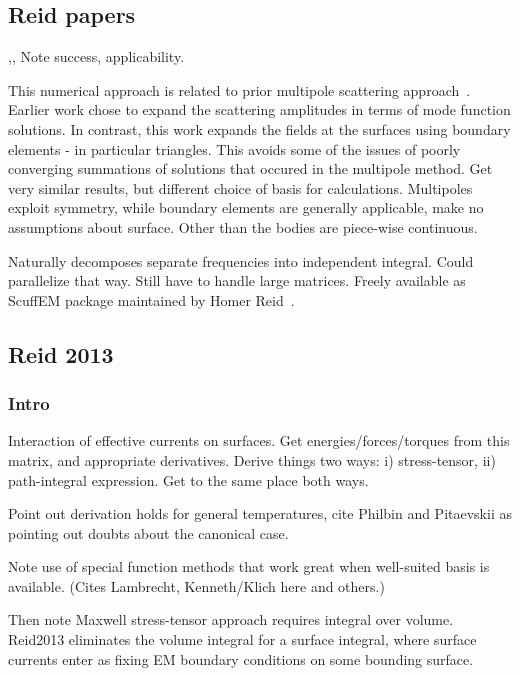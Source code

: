 \subsection{Reid papers}

\cite{Reid2009},\cite{Reid2011}, \cite{Reid2013} 
Note success, applicability.  

This numerical approach is related to prior multipole scattering approach~\cite{Rahi2009}.
Earlier work chose to expand the scattering amplitudes in terms of mode function
solutions.  In contrast, this work expands the fields at the surfaces using 
boundary elements - in particular triangles.  
This avoids some of the issues of poorly converging summations of solutions that occured in
the multipole method.  Get very similar results, but different choice of basis for calculations.
Multipoles exploit symmetry, while boundary elements are generally applicable, make no assumptions 
about surface.  Other than the bodies are piece-wise continuous.  

Naturally decomposes separate frequencies into independent integral.  Could parallelize that way.
Still have to handle large matrices.  Freely available as ScuffEM package maintained by
 Homer Reid~\cite{ScuffEM2016}.  

\subsection{Reid 2013}

\subsubsection{Intro}

Interaction of effective currents on surfaces.  Get energies/forces/torques from
this matrix, and appropriate derivatives.  Derive things two ways:
i) stress-tensor, ii) path-integral expression.  Get to the same place both ways.  

Point out derivation holds for general temperatures, cite Philbin and Pitaevskii
as pointing out doubts about the canonical case.  

Note use of special function methods that work great when well-suited basis is 
available.  (Cites Lambrecht, Kenneth/Klich here and others.)

Then note Maxwell stress-tensor approach requires integral over volume.
Reid2013 eliminates the volume integral for a surface integral, where surface currents
enter as fixing EM boundary conditions on some bounding surface.    

